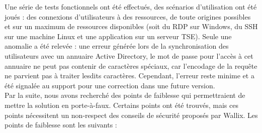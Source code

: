 Une série de tests fonctionnels ont été effectués, des scénarios d'utilisation ont été joués : des connexions d'utilisateurs à des ressources, de toute origines possibles et sur un maximum de ressources disponibles (soit du RDP sur Windows, du SSH sur une machine Linux et une application sur un serveur TSE). Seule une anomalie a été relevée : une erreur générée lors de la synchronisation des utilisateurs avec un annuaire Active Directory, le mot de passe pour l'accès à cet annuaire ne peut pas contenir de caractères spéciaux, car l'encodage de la requête ne parvient pas à traiter lesdits caractères. Cependant, l'erreur reste minime et a été signalée au support pour une correction dans une future version.\\
Par la suite, nous avons recherché des points de faiblesse qui permettraient de mettre la solution en porte-à-faux. Certains points ont été trouvés, mais ces points nécessitent un non-respect des conseils de sécurité proposés par Wallix. Les points de faiblesse sont les suivants :
